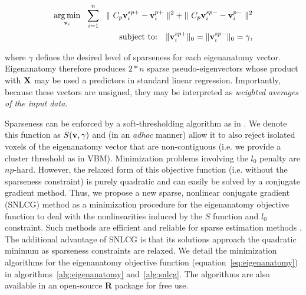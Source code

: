 \documentclass{llncs}
\newcommand{\X}{{\bf X}}
\newcommand{\vv}{{\bf v}}
\begin{document}
\begin{eqnarray}
\label{eq:eigenanatomy}
\underset{\vv_i}{\operatorname{arg\,min}}~~\sum^n_{i=1}~~\|~C_p \vv_i^{sp+} - \vv_i^{p+} ~\|^2 + \|~C_p \vv_i^{sp-} - \vv_i^{p-} ~\|^2 \\ 
\text{subject to:}~~~  \| \vv_i^{sp+} \|_0 =  \| \vv_i^{sp-} \|_0 = \gamma,\notag
\end{eqnarray}

where $\gamma$ defines the desired level of sparseness for each eigenanatomy vector.  
Eigenanatomy therefore produces $2*n$ sparse pseudo-eigenvectors whose product with $\X$ may be used a predictors in standard linear regression.  Importantly, because these vectors are unsigned, they may be interpreted as {\em weighted averages of the input data.}  

Sparseness can be enforced by a soft-thresholding algorithm as in \cite{sparsePCA_zou,sparsePCA_witten}.  We denote this function as $S( \vv , \gamma)$ and (in an {\em adhoc} manner) allow it to also reject isolated voxels of the eigenanatomy vector that are non-contiguous (i.e. we provide a cluster threshold as in VBM).  Minimization problems involving the $l_0$ penalty are $np$-hard.  However, the relaxed form of this objective function (i.e. without the sparseness constraint) is purely quadratic and can easily be solved by a conjugate gradient method.  Thus, we propose a new sparse, nonlinear conjugate gradient (SNLCG) method as a minimization procedure for the eigenanatomy objective function to deal with the nonlinearities induced by the $S$ function and $l_0$ constraint.  Such methods are efficient and reliable for sparse estimation methods \cite{marjanovic2010}.  The additional advantage of SNLCG is that its solutions approach the quadratic minimum as sparseness constraints are relaxed.  We detail the minimization algorithms for the eigenanatomy objective function (equation~\ref{eq:eigenanatomy}) in algorithms~\ref{alg:eigenanatomy} and~\ref{alg:snlcg}.  The algorithms are also available in an open-source {\bf R} package for free use. 
\end{document}
